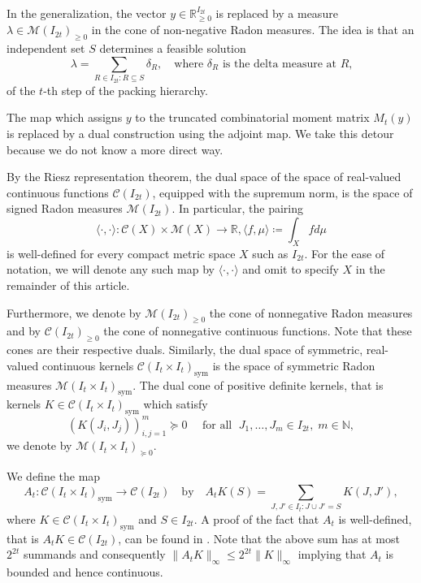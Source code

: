 \documentclass{amsart}
\newcommand{\R}{\mathbb{R}}
\DeclareMathOperator{\sym}{sym}
\begin{document}
In the generalization, the vector $y \in \R_{\geq 0}^{I_{2t}}$ is replaced by
a measure $\lambda \in \mathcal{M}(I_{2t})_{\geq 0}$ in the cone of non-negative Radon measures. The idea is that an independent set $S$ determines a feasible solution
\[
  \lambda = \sum_{R \in I_{2t} : R \subseteq S} \delta_R, \quad \text{where $\delta_R$ is the delta
measure at $R$,}
\]
of the $t$-th step of the packing hierarchy.

The map which assigns $y$ to the truncated combinatorial moment matrix
$M_t(y)$ is replaced by a dual construction using the
adjoint map. We take this detour because we do not know a more direct way.

By the Riesz representation theorem, the dual space of the space of
real-valued continuous functions $\mathcal{C}(I_{2t})$, equipped with
the supremum norm, is the space of signed Radon measures
$\mathcal{M}(I_{2t})$. In particular, the pairing 
\[
\langle \cdot , \cdot \rangle: \mathcal{C}(X) \times \mathcal{M}(X) \rightarrow \R, \langle f,\mu\rangle \coloneqq \int_X f d\mu
\]
is well-defined for every compact metric space $X$ such as $I_{2t}$. For the ease of notation, we will denote any such map by $\langle\cdot , \cdot \rangle$ and omit to specify $X$ in the remainder of this article.

Furthermore, we denote by $\mathcal{M}(I_{2t})_{\geq 0}$ the cone of nonnegative Radon measures and by $\mathcal{C}(I_{2t})_{\geq 0}$ the cone of nonnegative continuous functions. Note that these cones are their respective duals. Similarly, the
dual space of symmetric, real-valued continuous kernels
$\mathcal{C}(I_t \times I_t)_{\sym}$ is the space of symmetric Radon
measures $\mathcal{M}(I_t \times I_t)_{\sym}$. The dual cone of
positive definite kernels, that is kernels
$K \in \mathcal{C}(I_t \times I_t)_{\sym}$ which satisfy
\[
  (K(J_i, J_j))_{i,j=1}^m \succeq 0 \quad \text{ for all } \; J_1, \ldots, J_m
  \in I_{2t}, \; m \in \mathbb{N},
\]
we denote by $\mathcal{M}(I_t \times I_t)_{\succeq 0}$.

We define the map
\[
  A_t : \mathcal{C}(I_t \times I_t)_{\sym} \to \mathcal{C}(I_{2t})
  \quad \text{by} \quad
  A_t K(S) = \sum_{J,J' \in I_t : J \cup J' = S} K(J,J'),
\]
where $K \in \mathcal{C}(I_t \times I_t)_{\sym}$ and $S \in I_{2t}$.
A proof of the fact that $A_t$ is well-defined, that is $A_tK \in\mathcal{C}(I_{2t})$, can be found in \cite[Section 3.1]{Bekker-Oliveria-2023}.
Note that the above sum has at most $2^{2t}$ summands and consequently $\|A_tK\|_\infty \leq 2^{2t} \|K\|_\infty$ implying that $A_t$ is bounded and hence continuous. 
\end{document}
